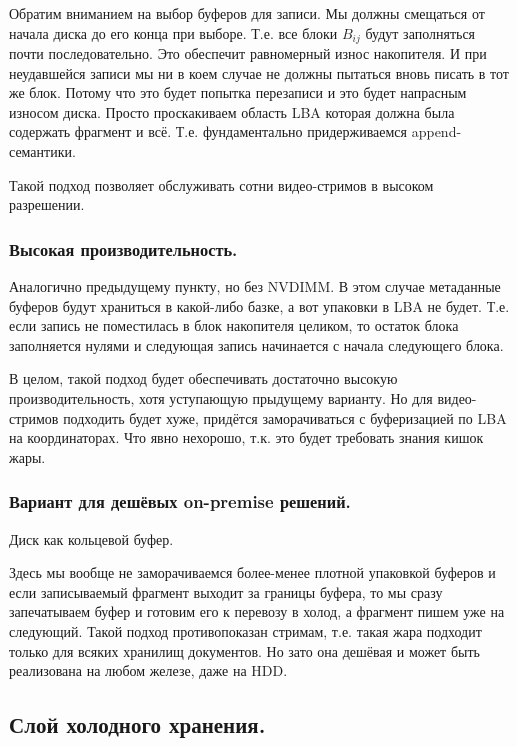 \documentclass[a4paper,12pt]{article}
\begin{document}
    Обратим вниманием на выбор буферов для записи. Мы должны смещаться от начала диска до его конца при выборе. Т.е. все блоки $B_{ij}$ будут заполняться почти последовательно. Это обеспечит
    равномерный износ накопителя. И при неудавшейся записи мы ни в коем случае не должны пытаться вновь писать в тот же блок. Потому что это будет попытка перезаписи и это будет напрасным
    износом диска. Просто проскакиваем область LBA которая должна была содержать фрагмент и всё. Т.е. фундаментально придерживаемся append-семантики.

    \smallskip
    Такой подход позволяет обслуживать сотни видео-стримов в высоком разрешении.

    \subsubsection{Высокая производительность.}

    Аналогично предыдущему пункту, но без NVDIMM. В этом случае метаданные буферов будут храниться в какой-либо базке, а вот упаковки в LBA не будет. Т.е. если запись не поместилась
    в блок накопителя целиком, то остаток блока заполняется нулями и следующая запись начинается с начала следующего блока.

    В целом, такой подход будет обеспечивать достаточно высокую производительность, хотя уступающую прыдущему варианту. Но для видео-стримов подходить будет хуже, придётся заморачиваться с
    буферизацией по LBA на координаторах. Что явно нехорошо, т.к. это будет требовать знания кишок жары.

    \subsubsection{Вариант для дешёвых on-premise решений.}

    Диск как кольцевой буфер.
    \smallskip

    Здесь мы вообще не заморачиваемся более-менее плотной упаковкой буферов и если записываемый фрагмент выходит за границы буфера, то мы сразу запечатываем буфер и готовим его
    к перевозу в холод, а фрагмент пишем уже на следующий. Такой подход противопоказан стримам, т.е. такая жара подходит только для всяких хранилищ документов. Но зато она дешёвая и может
    быть реализована на любом железе, даже на HDD.

    \subsection{Слой холодного хранения.}
\end{document}
